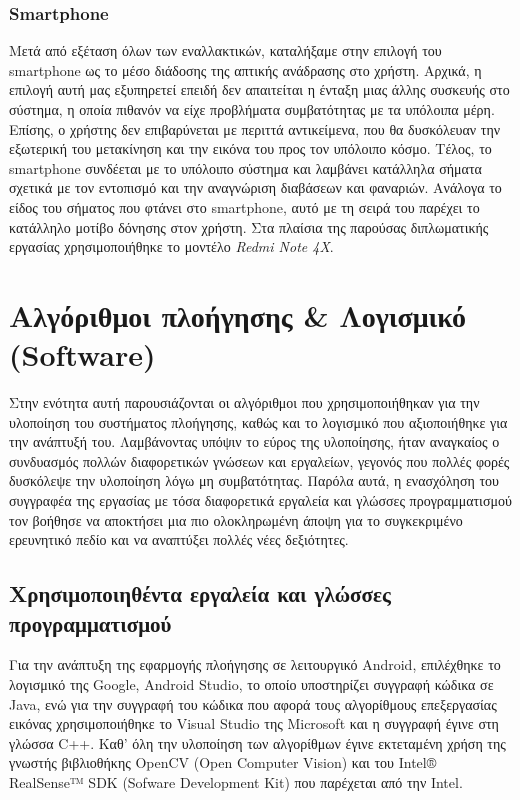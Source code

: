 \subsubsection{Smartphone}
Μετά από εξέταση όλων των εναλλακτικών, καταλήξαμε στην επιλογή του smartphone ως το μέσο διάδοσης της απτικής ανάδρασης στο χρήστη. Αρχικά, η επιλογή αυτή μας εξυπηρετεί επειδή δεν απαιτείται η ένταξη μιας άλλης συσκευής στο σύστημα, η οποία πιθανόν να είχε προβλήματα συμβατότητας με τα υπόλοιπα μέρη. Επίσης, ο χρήστης δεν επιβαρύνεται με περιττά αντικείμενα, που θα δυσκόλευαν την εξωτερική του μετακίνηση και την εικόνα του προς τον υπόλοιπο κόσμο. Τέλος, το smartphone συνδέεται με το υπόλοιπο σύστημα και λαμβάνει κατάλληλα σήματα σχετικά με τον εντοπισμό και την αναγνώριση διαβάσεων και φαναριών. Ανάλογα το είδος του σήματος που φτάνει στο smartphone, αυτό με τη σειρά του παρέχει το κατάλληλο μοτίβο δόνησης στον χρήστη. Στα πλαίσια της παρούσας διπλωματικής εργασίας χρησιμοποιήθηκε το μοντέλο \emph{Redmi Note 4X}.

\section{Αλγόριθμοι πλοήγησης \& Λογισμικό (Software)}
Στην ενότητα αυτή παρουσιάζονται οι αλγόριθμοι που χρησιμοποιήθηκαν για την υλοποίηση του συστήματος πλοήγησης, καθώς και το λογισμικό που αξιοποιήθηκε για την ανάπτυξή του. Λαμβάνοντας υπόψιν το εύρος της υλοποίησης, ήταν αναγκαίος ο συνδυασμός πολλών διαφορετικών γνώσεων και εργαλείων, γεγονός που πολλές φορές δυσκόλεψε την υλοποίηση λόγω μη συμβατότητας. Παρόλα αυτά, η ενασχόληση του συγγραφέα της εργασίας με τόσα διαφορετικά εργαλεία και γλώσσες προγραμματισμού τον βοήθησε να αποκτήσει μια πιο ολοκληρωμένη άποψη για το συγκεκριμένο ερευνητικό πεδίο και να αναπτύξει πολλές νέες δεξιότητες.

\subsection{Χρησιμοποιηθέντα εργαλεία και γλώσσες προγραμματισμού}
Για την ανάπτυξη της εφαρμογής πλοήγησης σε λειτουργικό Android, επιλέχθηκε το λογισμικό της Google, Android Studio, το οποίο υποστηρίζει συγγραφή κώδικα σε Java, ενώ για την συγγραφή του κώδικα που αφορά τους αλγορίθμους επεξεργασίας εικόνας χρησιμοποιήθηκε το Visual Studio της Microsoft και η συγγραφή έγινε στη γλώσσα C++. Καθ' όλη την υλοποίηση των αλγορίθμων έγινε εκτεταμένη χρήση της γνωστής βιβλιοθήκης OpenCV (Open Computer Vision) και του Intel® RealSense™ SDK (Sofware Development Kit) που παρέχεται από την Intel.


